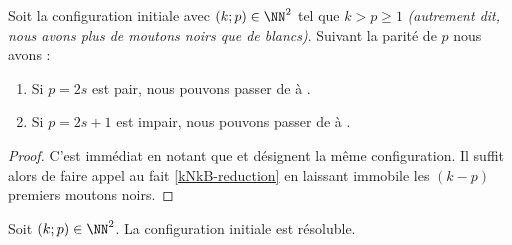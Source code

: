 \begin{fact}
	Soit la configuration initiale  avec $(k ; p) \in \NN^2$ tel que $k > p \geq 1$ \emph{(autrement dit, nous avons plus de moutons noirs que de blancs)}. Suivant la parité de $p$ nous avons :
	\begin{enumerate}
		\item Si $p = 2s$ est pair, nous pouvons passer de  à  .

		\item Si $p = 2s+1$ est impair, nous pouvons passer de  à  .
	\end{enumerate}
\end{fact}


\begin{proof}
	C'est immédiat en notant que  et  désignent la même configuration.
	Il suffit alors de faire appel au fait \ref{kNkB-reduction} en laissant immobile les $(k-p)$ premiers moutons noirs.
\end{proof}



\begin{fact}
	Soit $(k ; p) \in \NN^2$.
	La configuration initiale  est résoluble.
\end{fact}


